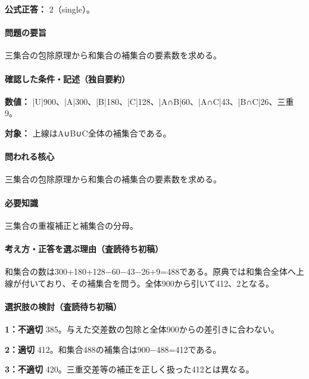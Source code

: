 \textbf{公式正答：} 2（single）。

\paragraph{問題の要旨} 三集合の包除原理から和集合の補集合の要素数を求める。

\paragraph{確認した条件・記述（独自要約）}\mbox{}\par

\noindent\textbf{数値：} |U|900、|A|300、|B|180、|C|128、|A∩B|60、|A∩C|43、|B∩C|26、三重9。\par

\noindent\textbf{対象：} 上線はA∪B∪C全体の補集合である。\par

\paragraph{問われる核心} 三集合の包除原理から和集合の補集合の要素数を求める。

\paragraph{必要知識} 三集合の重複補正と補集合の分母。

\paragraph{考え方・正答を選ぶ理由（査読待ち初稿）} 和集合の数は300+180+128−60−43−26+9=\allowbreak{}488である。原典では和集合全体へ上線が付いており、その補集合を問う。全体900から引いて412、2となる。

\paragraph{選択肢の検討（査読待ち初稿）}\mbox{}\par

\noindent\textbf{1：不適切} 385。与えた交差数の包除と全体900からの差引きに合わない。\par

\noindent\textbf{2：適切} 412。和集合488の補集合は900−488=\allowbreak{}412である。\par

\noindent\textbf{3：不適切} 420。三重交差等の補正を正しく扱った412とは異なる。\par

